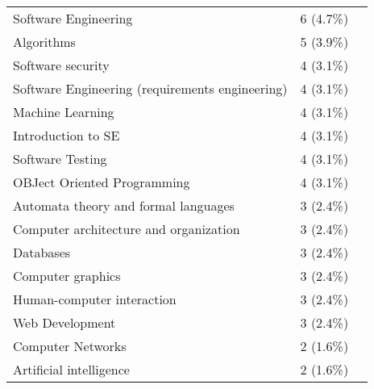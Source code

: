 \begin{table}[ht]
\begin{tabular}{l c p{4cm}}
		Software Engineering & 6 (4.7\%) & \cite{dengel2023qualitative,petrovska2024incorporating,rasnayaka2024empirical,rodriguezecheverria2024analysis,tanay2024exploratory,vierhauser2024towards} \\
		Algorithms & 5 (3.9\%) & \cite{dengel2023qualitative,jin2024teach,kuramitsu2023kogi,mendoncca2024evaluating,sterbini2024automated} \\
		Software security & 4 (3.1\%) & \cite{dengel2023qualitative,kruger2024performance,li2023evaluating,vierhauser2024towards} \\
		Software Engineering (requirements engineering) & 4 (3.1\%) & \cite{dengel2023qualitative,kirova2024software,kruger2024performance,vierhauser2024towards} \\
		Machine Learning & 4 (3.1\%) & \cite{dengel2023qualitative,drori2023human,reiche2024bridging,wolfer2024qualitative} \\
		Introduction to SE & 4 (3.1\%) & \cite{dengel2023qualitative,farah2023prompting,hanifi2023chatgpt,tran2023generating} \\
		Software Testing & 4 (3.1\%) & \cite{dengel2023qualitative,hanifi2023chatgpt,jalil2023chatgpt,vierhauser2024towards} \\
		OBJect Oriented Programming & 4 (3.1\%) & \cite{cipriano2023gpt3,cipriano2024llms,dengel2023qualitative,pankiewicz2023large} \\
		Automata theory and formal languages & 3 (2.4\%) & \cite{dengel2023qualitative,kruger2024performance,mendoncca2024evaluating} \\
		Computer architecture and organization & 3 (2.4\%) & \cite{dengel2023qualitative,kruger2024performance,mendoncca2024evaluating} \\
		Databases & 3 (2.4\%) & \cite{dengel2023qualitative,kruger2024performance,prakash2024integrating} \\
		Computer graphics & 3 (2.4\%) & \cite{dengel2023qualitative,feng2024more,kruger2024performance} \\
		Human-computer interaction & 3 (2.4\%) & \cite{dengel2023qualitative,freire2024may,kruger2024performance} \\
		Web Development & 3 (2.4\%) & \cite{dengel2023qualitative,macneil2023experiences,rajala2023call} \\
		Computer Networks & 2 (1.6\%) & \cite{dengel2023qualitative,kruger2024performance} \\
		Artificial intelligence & 2 (1.6\%) & \cite{dengel2023qualitative,kruger2024performance} \\

\end{tabular}
\end{table}

